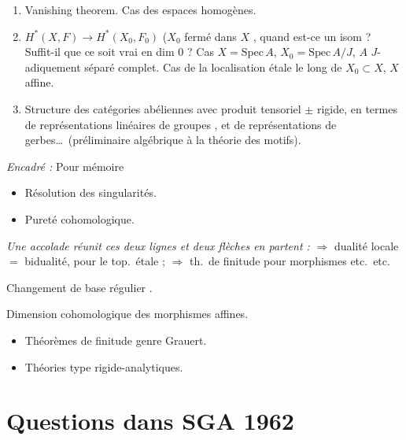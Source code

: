 \documentclass[11pt,a4paper]{article}
\begin{document}
\begin{enumerate}
\item[(20)] Vanishing theorem. Cas des espaces homogènes.

\item[(21)] $H^{*}(X, F) \to H^{*}(X_{0}, F_{0})$ ($X_{0}$ fermé dans $X$
, quand est-ce un isom ? Suffit-il que ce soit vrai en dim 0 ?
Cas $X = \mathrm{Spec}\,A$, $X_{0} = \mathrm{Spec}\,A/J$, $A$ $J$-adiquement
séparé complet. Cas de la localisation étale le long de $X_{0} \subset X$, $X$
affine.

\item[22)] Structure des catégories abéliennes avec produit tensoriel $\pm$
rigide, en termes de représentations linéaires de groupes
, et de représentations de gerbes…\ (préliminaire
algébrique à la théorie des motifs).

\end{enumerate}


\emph{Encadré :} Pour mémoire

\begin{itemize}
\item Résolution des singularités.
\item Pureté cohomologique.
\end{itemize}

\emph{Une accolade réunit ces deux lignes et deux flèches en partent :}
$\Rightarrow$ dualité locale $=$ bidualité, pour le top.\ étale ;
$\Rightarrow$ th.\ de finitude pour morphismes  etc.\ etc.

Changement de base régulier .

Dimension cohomologique des morphismes affines.

\begin{itemize}
\item Théorèmes de finitude genre Grauert.
\item Théories \struck{\ill} type rigide-analytiques.
\end{itemize}

\section*{Questions dans SGA 1962}
\end{document}
